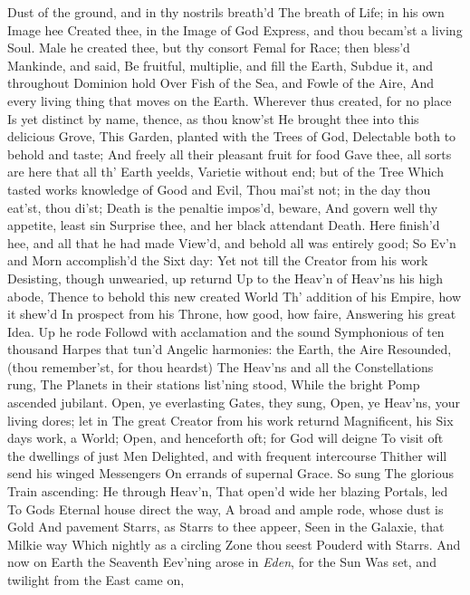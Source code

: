\documentclass[11pt]{book}
\newcounter {last}
\begin{document}
Dust of the ground, and in thy nostrils breath'd 
The breath of Life; in his own Image hee 
Created thee, in the Image of God 
Express, and thou becam'st a living Soul. 
Male he created thee, but thy consort 
Femal for Race; then bless'd Mankinde, and said, 
Be fruitful, multiplie, and fill the Earth, 
Subdue it, and throughout Dominion hold 
Over Fish of the Sea, and Fowle of the Aire, 
And every living thing that moves on the Earth. 
Wherever thus created, for no place 
Is yet distinct by name, thence, as thou know'st 
He brought thee into this delicious Grove, 
This Garden, planted with the Trees of God, 
Delectable both to behold and taste; 
And freely all their pleasant fruit for food 
Gave thee, all sorts are here that all th' Earth yeelds, 
Varietie without end; but of the Tree 
Which tasted works knowledge of Good and Evil, 
Thou mai'st not; in the day thou eat'st, thou di'st; 
Death is the penaltie impos'd, beware, 
And govern well thy appetite, least sin 
Surprise thee, and her black attendant Death. 
Here finish'd hee, and all that he had made 
View'd, and behold all was entirely good; 
So Ev'n and Morn accomplish'd the Sixt day: 
Yet not till the Creator from his work 
Desisting, though unwearied, up returnd 
Up to the Heav'n of Heav'ns his high abode, 
Thence to behold this new created World 
Th' addition of his Empire, how it shew'd 
In prospect from his Throne, how good, how faire, 
Answering his great Idea.  Up he rode 
Followd with acclamation and the sound 
Symphonious of ten thousand Harpes that tun'd 
Angelic harmonies: the Earth, the Aire 
Resounded, (thou remember'st, for thou heardst) 
The Heav'ns and all the Constellations rung, 
The Planets in their stations list'ning stood, 
While the bright Pomp ascended jubilant. 
Open, ye everlasting Gates, they sung, 
Open, ye Heav'ns, your living dores; let in 
The great Creator from his work returnd 
Magnificent, his Six days work, a World; 
Open, and henceforth oft; for God will deigne 
To visit oft the dwellings of just Men 
Delighted, and with frequent intercourse 
Thither will send his winged Messengers 
On errands of supernal Grace.  So sung 
The glorious Train ascending: He through Heav'n, 
That open'd wide her blazing Portals, led 
To Gods Eternal house direct the way, 
A broad and ample rode, whose dust is Gold 
And pavement Starrs, as Starrs to thee appeer, 
Seen in the Galaxie, that Milkie way 
Which nightly as a circling Zone thou seest 
Pouderd with Starrs.  And now on Earth the Seaventh 
Eev'ning arose in \textit{Eden}, for the Sun 
Was set, and twilight from the East came on, 
\end{document}
